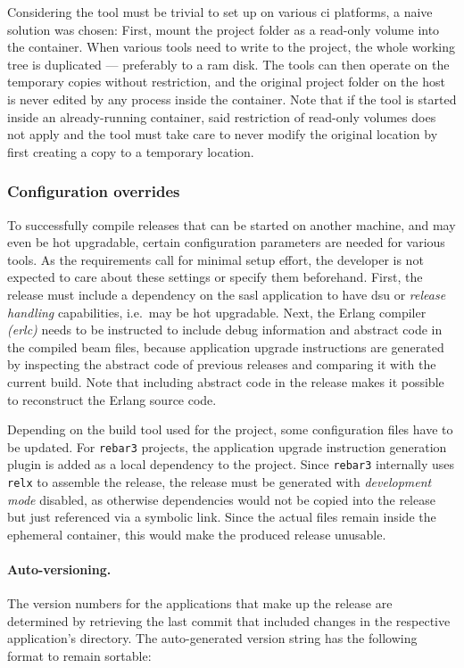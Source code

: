 Considering the tool must be trivial to set up on various \acrshort{ci} platforms, a naive solution was chosen: First, mount the project folder as a read-only volume into the container. When various tools need to write to the project, the whole working tree is duplicated --- preferably to a \acrshort{ram} disk. The tools can then operate on the temporary copies without restriction, and the original project folder on the host is never edited by any process inside the container. Note that if the tool is started inside an already-running container, said restriction of read-only volumes does not apply and the tool must take care to never modify the original location by first creating a copy to a temporary location.


\subsubsection{Configuration overrides} To successfully compile releases that can be started on another machine, and may even be hot upgradable, certain configuration parameters are needed for various tools. As the requirements call for minimal setup effort, the developer is not expected to care about these settings or specify them beforehand. First, the release must include a dependency on the \acrfull{sasl} application to have \acrshort{dsu} or \emph{release handling} capabilities, i.e.~may be hot upgradable. Next, the Erlang compiler \emph{(erlc)} needs to be instructed to include debug information and abstract code in the compiled \acrshort{beam} files, because application upgrade instructions are generated by inspecting the abstract code of previous releases and comparing it with the current build. Note that including abstract code in the release makes it possible to reconstruct the Erlang source code.~\cite{doc:otp}

Depending on the build tool used for the project, some configuration files have to be updated. For \lstinline|rebar3| projects, the application upgrade instruction generation plugin is added as a local dependency to the project. Since \lstinline|rebar3| internally uses \lstinline|relx| to assemble the release, the release must be generated with \emph{development mode} disabled, as otherwise dependencies would not be copied into the release but just referenced via a symbolic link. Since the actual files remain inside the ephemeral container, this would make the produced release unusable.

\cleardoublepage
\paragraph{Auto-versioning.} The version numbers for the applications that make up the release are determined by retrieving the last commit that included changes in the respective application's directory. The auto-generated version string has the following format to remain sortable:


